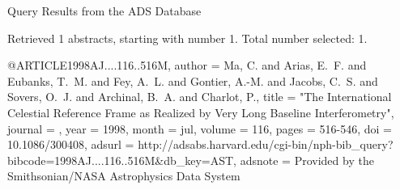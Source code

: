 Query Results from the ADS Database


Retrieved 1 abstracts, starting with number 1.  Total number selected: 1.

@ARTICLE{1998AJ....116..516M,
   author = {{Ma}, C. and {Arias}, E.~F. and {Eubanks}, T.~M. and {Fey}, A.~L. and 
	{Gontier}, A.-M. and {Jacobs}, C.~S. and {Sovers}, O.~J. and 
	{Archinal}, B.~A. and {Charlot}, P.},
    title = "{The International Celestial Reference Frame as Realized by Very Long Baseline Interferometry}",
  journal = {\aj},
     year = 1998,
    month = jul,
   volume = 116,
    pages = {516-546},
      doi = {10.1086/300408},
   adsurl = {http://adsabs.harvard.edu/cgi-bin/nph-bib_query?bibcode=1998AJ....116..516M&db_key=AST},
  adsnote = {Provided by the Smithsonian/NASA Astrophysics Data System}
}


